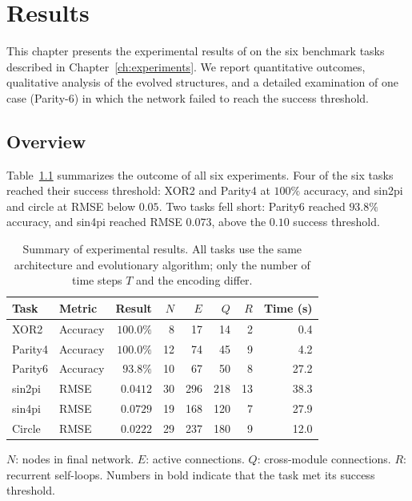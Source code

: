 
\chapter{Results}
\label{ch:results}

This chapter presents the experimental results of \modnet{} on the
six benchmark tasks described in Chapter~\ref{ch:experiments}.
We report quantitative outcomes, qualitative analysis of the evolved
structures, and a detailed examination of one case (Parity-6) in
which the network failed to reach the success threshold.

\section{Overview}
\label{sec:overview}
\label{sec:results-overview}

Table~\ref{tab:main-results} summarizes the outcome of all six
experiments. Four of the six tasks reached their success threshold:
XOR2 and Parity4 at $100\%$ accuracy, and sin2pi and circle at RMSE
below $0.05$. Two tasks fell short: Parity6 reached $93.8\%$ accuracy,
and sin4pi reached RMSE $0.073$, above the $0.10$ success threshold.

\begin{table}[h]
  \centering
  \small
  \caption{Summary of experimental results. All tasks use the same
    architecture and evolutionary algorithm; only the number of time
    steps $T$ and the encoding differ.}
  \label{tab:main-results}
  \begin{tabular}{llrrrrrr}
    \toprule
    \textbf{Task} & \textbf{Metric} & \textbf{Result} & $N$
      & $E$ & $Q$ & $R$ & \textbf{Time (s)} \\
    \midrule
    XOR2      & Accuracy   & $\mathbf{100.0\%}$     &  8 &  17 & 14 & 2 &  0.4 \\
    Parity4   & Accuracy   & $\mathbf{100.0\%}$     & 12 &  74 & 45 & 9 &  4.2 \\
    Parity6   & Accuracy   & $93.8\%$               & 10 &  67 & 50 & 8 & 27.2 \\
    sin2pi    & RMSE       & $\mathbf{0.0412}$      & 30 & 296 & 218 & 13 & 38.3 \\
    sin4pi    & RMSE       & $0.0729$               & 19 & 168 & 120 & 7 & 27.9 \\
    Circle    & RMSE       & $\mathbf{0.0222}$      & 29 & 237 & 180 & 9 & 12.0 \\
    \bottomrule
  \end{tabular}
  \vspace{0.3em}
  \par\footnotesize{$N$: nodes in final network. $E$: active connections.
  $Q$: cross-module connections. $R$: recurrent self-loops.
  Numbers in bold indicate that the task met its success threshold.}
\end{table}

